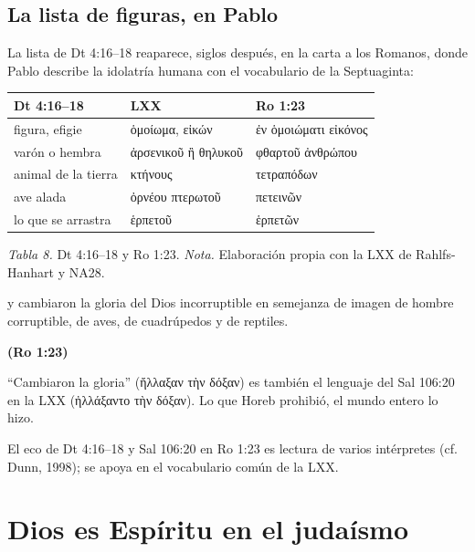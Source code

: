\documentclass[11pt,letterpaper]{article}
\newcommand{\grc}[1]{\foreignlanguage{ancientgreek}{#1}}
\newcommand{\fuente}[1]{\par\hfill{\upshape\bfseries\small\textcolor{azul}{#1}}}
\begin{document}
\subsection{La lista de figuras, en Pablo}

La lista de Dt 4:16--18 reaparece, siglos después, en la carta a los Romanos, donde Pablo describe la idolatría humana con el vocabulario de la Septuaginta:

\begin{center}\small\renewcommand{\arraystretch}{1.2}
\begin{tabular}{@{}L{3.6cm}L{5.2cm}L{5.2cm}@{}}
\toprule
\textbf{Dt 4:16--18} & \textbf{LXX} & \textbf{Ro 1:23} \\ \midrule
figura, efigie & \grc{ὁμοίωμα}, \grc{εἰκών} & \grc{ἐν ὁμοιώματι εἰκόνος} \\
varón o hembra & \grc{ἀρσενικοῦ ἢ θηλυκοῦ} & \grc{φθαρτοῦ ἀνθρώπου} \\
animal de la tierra & \grc{κτήνους} & \grc{τετραπόδων} \\
ave alada & \grc{ὀρνέου πτερωτοῦ} & \grc{πετεινῶν} \\
lo que se arrastra & \grc{ἑρπετοῦ} & \grc{ἑρπετῶν} \\
\bottomrule
\end{tabular}\par
{\footnotesize\color{gris}\textit{Tabla 8.} Dt 4:16--18 y Ro 1:23. \textit{Nota.} Elaboración propia con la LXX de Rahlfs-Hanhart y NA28.}
\end{center}

\begin{cita}y cambiaron la gloria del Dios incorruptible en semejanza de imagen de hombre corruptible, de aves, de cuadrúpedos y de reptiles.\fuente{(Ro 1:23)}\end{cita}

``Cambiaron la gloria'' (\grc{ἤλλαξαν τὴν δόξαν}) es también el lenguaje del Sal 106:20 en la LXX (\grc{ἠλλάξαντο τὴν δόξαν}). Lo que Horeb prohibió, el mundo entero lo hizo.

\begin{nota}[Precisión]
El eco de Dt 4:16--18 y Sal 106:20 en Ro 1:23 es lectura de varios intérpretes (cf. Dunn, 1998); se apoya en el vocabulario común de la LXX.
\end{nota}

\section{Dios es Espíritu en el judaísmo}\label{sec:judaismo-esp}
\end{document}
